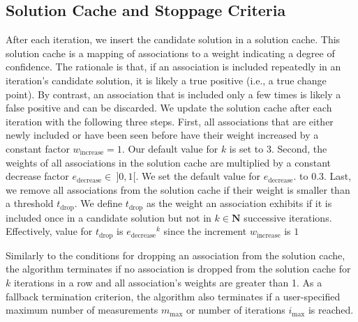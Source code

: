 \documentclass[sigconf]{acmart}
\begin{document}
	\subsection{Solution Cache and Stoppage Criteria}\label{sec:solutioncache}
	After each iteration, we insert the candidate solution in a solution cache. This solution cache is a mapping of associations to a weight indicating a degree of confidence. 
	The rationale is that, if an association is included repeatedly in an iteration's candidate solution, it is likely a true positive (i.e., a true change point). 
	By contrast, an association that is included only a few times is likely a false positive and can be discarded. 
	We update the solution cache after each iteration with the following three steps. 
	First, all associations that are either newly included or have been seen before have their weight increased by a constant factor $w_\text{increase} = 1$. Our default value for $k$ is set to 3.
	Second, the weights of all associations in the solution cache are multiplied by a constant decrease factor $e_\text{decrease}\in~\rbrack 0,1 \lbrack$. We set the default value for $e_\text{decrease}$. to 0.3.
	Last, we remove all associations from the solution cache if their weight is smaller than a threshold $t_\text{drop}$. We define $t_\text{drop}$ as the weight an association exhibits if it is included once in a candidate solution but not in $k \in \mathbf{N}$ successive iterations. Effectively, value for $t_\text{drop}$ is ${e_\text{decrease}}^k$ since the increment $w_\text{increase}$ is $1$
	
	Similarly to the conditions for dropping an association from the solution cache, the algorithm terminates if no association is dropped from the solution cache for $k$ iterations in a row and all association's weights are greater than 1. As a fallback termination criterion, the algorithm also terminates if a user-specified maximum number of measurements $m_\text{max}$ or number of iterations $i_\text{max}$ is reached. 
	
\end{document}
